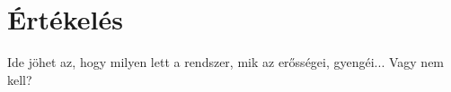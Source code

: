 

\section{Értékelés}
\label{sec:ertekeles}

Ide jöhet az, hogy milyen lett a rendszer, mik az erősségei, gyengéi... Vagy nem kell?
